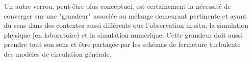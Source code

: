 Un autre verrou, peut-être plus conceptuel, est certainement la nécessité de converger sur une "grandeur" associée au mélange demeurant pertinente et ayant du sens dans des contextes aussi différents que l'observation in-situ, la simulation physique (en laboratoire) et la simulation numérique. Cette grandeur doit aussi prendre tout son sens et être partagée par les schémas de fermeture turbulente des modèles de circulation générale.






